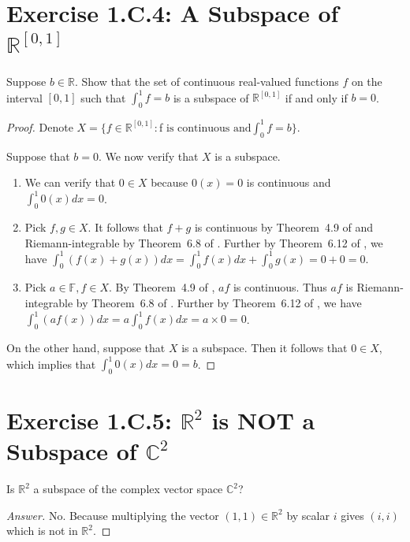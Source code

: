\section{Exercise 1.C.4: A Subspace of $\mathbb{R}^{[0,1]}$}
Suppose $b\in\mathbb{R}$. Show that the set of continuous real-valued functions $f$ on the interval $[0,1]$ such that $\int_0^1 f=b$ is a subspace of $\mathbb{R}^{[0,1]}$ if and only if $b=0$.
\begin{proof}
Denote $X=\{f\in\mathbb{R}^{[0,1]}: $f$\text{ is continuous and} \int_0^1 f=b\}$.

Suppose that $b=0$. We now verify that $X$ is a subspace.
\begin{enumerate}
\item We can verify that $0\in X$ because $0(x)=0$ is continuous and $\int_0^1 0(x)dx=0$.
\item Pick $f,g\in X$. It follows that $f+g$ is continuous by Theorem~4.9 of \cite{rudin1976principles} and Riemann-integrable by Theorem~6.8 of \cite{rudin1976principles}. Further by Theorem~6.12 of \cite{rudin1976principles}, we have $\int_0^1 (f(x)+g(x))dx=\int_0^1 f(x)dx+\int_0^1 g(x)=0+0=0$.
\item Pick $a\in\mathbb{F}, f\in X$. By Theorem~4.9 of \cite{rudin1976principles}, $af$ is continuous. Thus $af$ is Riemann-integrable by Theorem~6.8 of \cite{rudin1976principles}. Further by Theorem~6.12 of \cite{rudin1976principles}, we have $\int_0^1 (af(x))dx=a\int_0^1 f(x)dx=a\times 0=0$.
\end{enumerate}

On the other hand, suppose that $X$ is a subspace. Then it follows that $0\in X$, which implies that $\int_0^1 0(x)dx=0=b$.
\end{proof}

\section{Exercise 1.C.5: $\mathbb{R}^2$ is NOT a Subspace of $\mathbb{C}^2$}
Is $\mathbb{R}^2$ a subspace of the complex vector space $\mathbb{C}^2$?
\begin{proof}[Answer]
No. Because multiplying the vector $(1,1)\in\mathbb{R}^2$ by scalar $i$ gives $(i,i)$ which is not in $\mathbb{R}^2$.
\end{proof}

